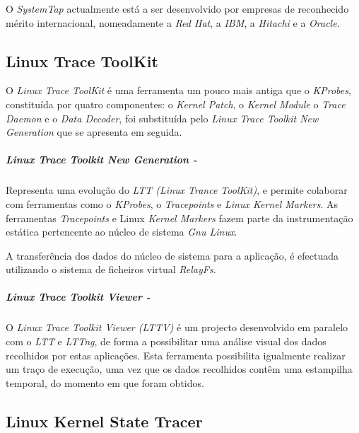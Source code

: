 O \textit{SystemTap} actualmente está a ser desenvolvido por empresas de reconhecido mérito internacional, nomeadamente a \textit{Red Hat}, a \textit{IBM}, a \textit{Hitachi} e a \textit{Oracle}.

\subsection{Linux Trace ToolKit}\label{cap:linux_trace_toolkit_overview}

O \textit{Linux Trace ToolKit} é uma ferramenta um pouco mais antiga que o \textit{KProbes}, constituída por quatro componentes: o \textit{Kernel Patch}, o \textit{Kernel Module} o \textit{Trace Daemon} e o \textit{Data Decoder}, foi substituída pelo \textit{Linux Trace Toolkit New Generation} que se apresenta em seguida.

\subparagraph{Linux Trace Toolkit New Generation - }\label{cap:lttng_overview}


Representa uma evolução do \textit{LTT (Linux Trance ToolKit)}, e permite colaborar com ferramentas como o \textit{KProbes}, o \textit{Tracepoints}\cite{Mathieu2009} e \textit{Linux Kernel Markers}\cite{Mathieu2009}.
As ferramentas \textit{Tracepoints} e Linux \textit{Kernel Markers} fazem parte da instrumentação estática pertencente ao núcleo de sistema \textit{Gnu Linux}.

A transferência dos dados do núcleo de sistema para a aplicação, é efectuada utilizando o sistema de ficheiros virtual \textit{RelayFs}.


\subparagraph{Linux Trace Toolkit Viewer - }\label{cap:lttv_overview}
O \textit{Linux Trace Toolkit Viewer (LTTV)} é um projecto desenvolvido em paralelo com o \textit{LTT} e \textit{LTTng}, de forma a possibilitar uma análise visual dos dados recolhidos por estas aplicações.
Esta ferramenta possibilita igualmente realizar um traço de execução, uma vez que os dados recolhidos contêm uma estampilha temporal, do momento em que foram obtidos.


\subsection{Linux Kernel State Tracer}

